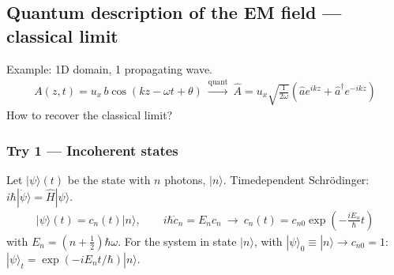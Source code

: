 \documentclass[letterpaper,10pt,english]{jupyterBook}
\begin{document}
\subsection{Quantum description of the EM field — classical limit}
\label{\detokenize{ch/quantum-mechanics/qft/photons:quantum-description-of-the-em-field-classical-limit}}\label{\detokenize{ch/quantum-mechanics/qft/photons:quantum-mechanics-qft-photons-em-field-quantization-classical-limit}}
\sphinxAtStartPar
Example: 1D domain, 1 propagating wave.
\begin{equation*}
\begin{split}
A(z,t)=u_x\,b\cos(kz-\omega t+\theta)\ \xrightarrow{\text{quant}}\
\hat A=u_x\sqrt{\tfrac1{2\omega}}\left(\hat a e^{ikz}+\hat a^\dagger e^{-ikz}\right)
\end{split}
\end{equation*}
\sphinxAtStartPar
How to recover the classical limit?


\subsubsection{Try 1 — Incoherent states}
\label{\detokenize{ch/quantum-mechanics/qft/photons:try-1-incoherent-states}}\label{\detokenize{ch/quantum-mechanics/qft/photons:quantum-mechanics-qft-photons-em-field-quantization-classical-limit-incoherent-states}}
\sphinxAtStartPar
Let \(|\psi\rangle(t)\) be the state with \(n\) photons, \(|n\rangle\). Time\sphinxhyphen{}dependent Schrödinger: \(i\hbar|\dot\psi\rangle=\hat H|\psi\rangle\).
\begin{equation*}
\begin{split}
|\psi\rangle(t)=c_n(t)|n\rangle,\qquad i\hbar\dot c_n=E_nc_n\ \to\ c_n(t)=c_{n0}\exp\!\left(-\frac{iE_n}{\hbar}t\right)
\end{split}
\end{equation*}
\sphinxAtStartPar
with \(E_n=(n+\tfrac12)\hbar\omega\). For the system in state \(|n\rangle\), with \(|\psi\rangle_0\equiv|n\rangle\to c_{n0}=1\): \(|\psi\rangle_t=\exp(-iE_nt/\hbar)|n\rangle\).
\end{document}
